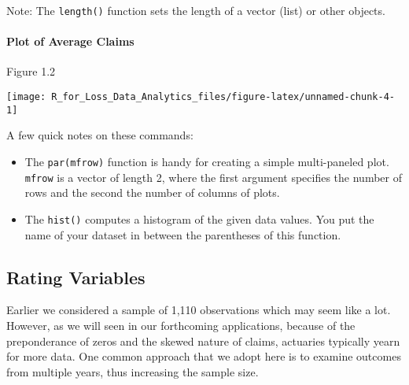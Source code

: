 \documentclass[]{book}
\newenvironment{Shaded}{\begin{snugshade}}{\end{snugshade}}
\newcommand{\KeywordTok}[1]{\textcolor[rgb]{0.13,0.29,0.53}{\textbf{#1}}}
\newcommand{\DataTypeTok}[1]{\textcolor[rgb]{0.13,0.29,0.53}{#1}}
\newcommand{\DecValTok}[1]{\textcolor[rgb]{0.00,0.00,0.81}{#1}}
\newcommand{\StringTok}[1]{\textcolor[rgb]{0.31,0.60,0.02}{#1}}
\newcommand{\OperatorTok}[1]{\textcolor[rgb]{0.81,0.36,0.00}{\textbf{#1}}}
\newcommand{\NormalTok}[1]{#1}
\let\oldparagraph\paragraph
\renewcommand{\paragraph}[1]{\oldparagraph{#1}\mbox{}}
\theoremstyle{definition}
\theoremstyle{definition}
\theoremstyle{definition}
\theoremstyle{remark}
\begin{document}
Note: The \texttt{length()} function sets the length of a vector (list)
or other objects.

\paragraph{Plot of Average Claims}\label{plot-of-average-claims}

Figure 1.2

\begin{Shaded}
\end{Shaded}

\begin{center}\texttt{[image: R\_for\_Loss\_Data\_Analytics\_files/figure-latex/unnamed-chunk-4-1]} \end{center}

A few quick notes on these commands:

\begin{itemize}
\item
  The \texttt{par(mfrow)} function is handy for creating a simple
  multi-paneled plot. \texttt{mfrow} is a vector of length 2, where the
  first argument specifies the number of rows and the second the number
  of columns of plots.
\item
  The \texttt{hist()} computes a histogram of the given data values. You
  put the name of your dataset in between the parentheses of this
  function.
\end{itemize}

\subsection{Rating Variables}\label{rating-variables}

Earlier we considered a sample of 1,110 observations which may seem like
a lot. However, as we will seen in our forthcoming applications, because
of the preponderance of zeros and the skewed nature of claims, actuaries
typically yearn for more data. One common approach that we adopt here is
to examine outcomes from multiple years, thus increasing the sample
size.
\end{document}
